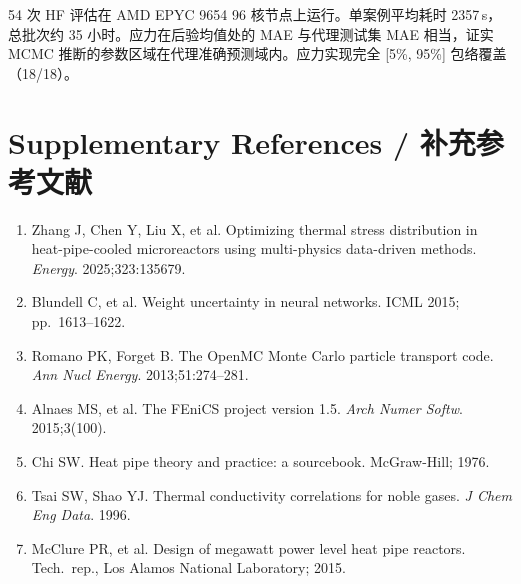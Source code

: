 \documentclass[11pt,a4paper]{article}
\begin{document}
54 次 HF 评估在 AMD EPYC 9654 96 核节点上运行。单案例平均耗时
2357\,s，总批次约 35 小时。应力在后验均值处的 MAE 与代理测试集 MAE
相当，证实 MCMC 推断的参数区域在代理准确预测域内。应力实现完全
[5\%, 95\%] 包络覆盖（18/18）。


\section*{Supplementary References / 补充参考文献}

\begin{enumerate}\small
\setcounter{enumi}{8}
\item Zhang J, Chen Y, Liu X, et al. Optimizing thermal stress
      distribution in heat-pipe-cooled microreactors using multi-physics
      data-driven methods. \textit{Energy}. 2025;323:135679.
\item Blundell C, et al. Weight uncertainty in neural networks. ICML
      2015; pp.\ 1613--1622.
\item Romano PK, Forget B. The OpenMC Monte Carlo particle transport
      code. \textit{Ann Nucl Energy}. 2013;51:274--281.
\item Alnaes MS, et al. The FEniCS project version 1.5. \textit{Arch
      Numer Softw}. 2015;3(100).
\item Chi SW. Heat pipe theory and practice: a sourcebook.
      McGraw-Hill; 1976.
\item Tsai SW, Shao YJ. Thermal conductivity correlations for noble
      gases. \textit{J Chem Eng Data}. 1996.
\item McClure PR, et al. Design of megawatt power level heat pipe
      reactors. Tech.\ rep., Los Alamos National Laboratory; 2015.
\end{enumerate}
\end{document}
